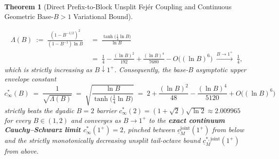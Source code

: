 \documentclass[11pt,reqno]{amsart}
\newtheorem{theorem}{Theorem}[section]
\theoremstyle{definition}
\theoremstyle{remark}
\begin{document}
\begin{theorem}[Direct Prefix-to-Block Unsplit Fej\'er Coupling and Continuous Geometric Base-$B > 1$ Variational Bound]
\begin{enumerate}
  \begin{equation}\label{eq:lambda_b_tanh}
    \begin{aligned}
      \Lambda(B) \;:=\; \frac{(1 - B^{-1/2})^2}{(1 - B^{-1})\ln B} &\;=\; \frac{\tanh\!\bigl(\tfrac{1}{4}\ln B\bigr)}{\ln B} \\
      &\;=\; \frac{1}{4} - \frac{(\ln B)^2}{192} + \frac{(\ln B)^4}{7680} - O\bigl((\ln B)^6\bigr) \;\xrightarrow{B \to 1^+}\; \frac{1}{4},
    \end{aligned}
  \end{equation}
  which is strictly increasing as $B \downarrow 1^+$. Consequently, the base-$B$ asymptotic upper envelope constant
  \begin{equation}\label{eq:c_infty_b}
    c_\infty^*(B) \;=\; \frac{1}{\sqrt{\Lambda(B)}} \;=\; \sqrt{\frac{\ln B}{\tanh\!\bigl(\tfrac{1}{4}\ln B\bigr)}} \;=\; 2 + \frac{(\ln B)^2}{48} - \frac{(\ln B)^4}{5120} + O\bigl((\ln B)^6\bigr)
  \end{equation}
  strictly beats the dyadic $B = 2$ barrier $c_\infty^*(2) = (1 + \sqrt{2})\sqrt{\ln 2} \approx 2.009965$ for every $B \in (1, 2)$ and converges as $B \to 1^+$ to the \textbf{exact continuum Cauchy--Schwarz limit $c_\infty^*(1^+) = 2$}, pinched between $\underline{c}_M^{\mathrm{joint}}(1^+)$ from below and the strictly monotonically decreasing unsplit tail-octave bound $\underline{c}_M^{*,\mathrm{joint}}(1^+)$ from above.
\end{enumerate}
\end{theorem}
\end{document}
